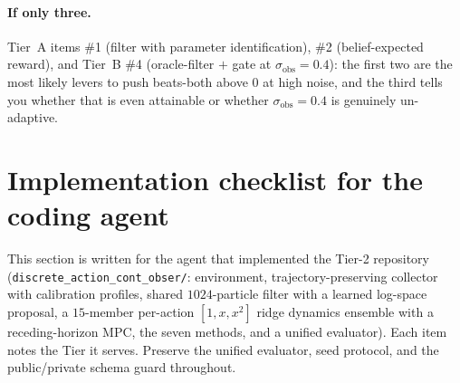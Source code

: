\documentclass[11pt]{article}
\newcommand{\sobs}{\sigma_{\mathrm{obs}}}
\begin{document}
\paragraph{If only three.} Tier~A items \#1 (filter with parameter identification),
\#2 (belief-expected reward), and Tier~B \#4 (oracle-filter $+$ gate at
$\sobs{=}0.4$): the first two are the most likely levers to push beats-both above
$0$ at high noise, and the third tells you whether that is even attainable or
whether $\sobs{=}0.4$ is genuinely un-adaptive.

\section{Implementation checklist for the coding agent}
\label{sec:checklist}
This section is written for the agent that implemented the Tier-2 repository
(\texttt{discrete\_action\_cont\_obser/}: environment, trajectory-preserving
collector with calibration profiles, shared $1024$-particle filter with a learned
log-space proposal, a $15$-member per-action $[1,x,x^2]$ ridge dynamics ensemble
with a receding-horizon MPC, the seven methods, and a unified evaluator). Each item
notes the Tier it serves. Preserve the unified evaluator, seed protocol, and the
public/private schema guard throughout.
\end{document}
